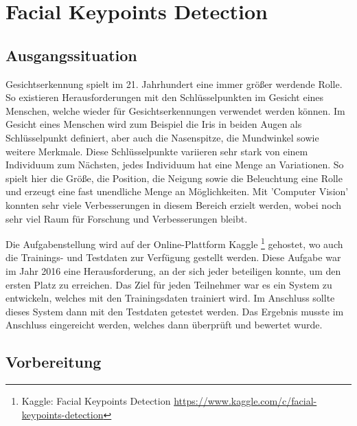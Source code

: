 \chapter{Facial Keypoints Detection}
\label{cha:Facial Keypoints Detection}

\section{Ausgangssituation}

Gesichtserkennung spielt im 21. Jahrhundert eine immer größer werdende Rolle. 
So existieren Herausforderungen mit den Schlüsselpunkten im Gesicht eines Menschen, welche wieder für Gesichtserkennungen verwendet werden können. 
Im Gesicht eines Menschen wird zum Beispiel die Iris in beiden Augen als Schlüsselpunkt definiert, aber auch die Nasenspitze, die Mundwinkel sowie weitere Merkmale.
Diese Schlüsselpunkte variieren sehr stark von einem Individuum zum Nächsten, jedes Individuum hat eine Menge an Variationen. 
So spielt hier die Größe, die Position, die Neigung sowie die Beleuchtung eine Rolle und erzeugt eine fast unendliche Menge an Möglichkeiten. 
Mit 'Computer Vision' konnten sehr viele Verbesserungen in diesem Bereich erzielt werden, wobei noch sehr viel Raum für Forschung und Verbesserungen bleibt. \newline

\noindent
Die Aufgabenstellung wird auf der Online-Plattform Kaggle \footnote{Kaggle: Facial Keypoints Detection \url{https://www.kaggle.com/c/facial-keypoints-detection}} gehostet, wo auch die Trainings- und Testdaten zur Verfügung gestellt werden. 
Diese Aufgabe war im Jahr 2016 eine Herausforderung, an der sich jeder beteiligen konnte, um den ersten Platz zu erreichen. 
Das Ziel für jeden Teilnehmer war es ein System zu entwickeln, welches mit den Trainingsdaten trainiert wird.
Im Anschluss sollte dieses System dann mit den Testdaten getestet werden. 
Das Ergebnis musste im Anschluss eingereicht werden, welches dann überprüft und bewertet wurde. 

\section{Vorbereitung}

